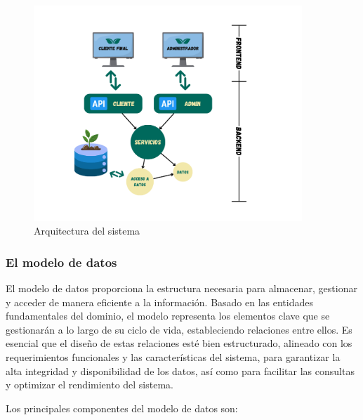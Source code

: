 \begin{figure}[ht!]
    \centering
    \includegraphics[width=0.9\textwidth]{Images/architecture.png}
    \caption{Arquitectura del sistema}
    \label{fig:architecture}
\end{figure}

\subsubsection{El modelo de datos}
El modelo de datos proporciona la estructura necesaria para almacenar, gestionar y acceder de manera eficiente a la información. 
Basado en las entidades fundamentales del dominio, el modelo representa los elementos clave que se gestionarán a lo largo de su 
ciclo de vida, estableciendo relaciones entre ellos. Es esencial que el diseño de estas relaciones esté bien estructurado, 
alineado con los requerimientos funcionales y las características del sistema, para garantizar la alta integridad y disponibilidad 
de los datos, así como para facilitar las consultas y optimizar el rendimiento del sistema.

Los principales componentes del modelo de datos son:

